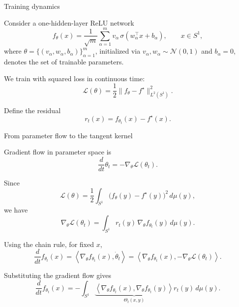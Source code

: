 \documentclass[10pt,aspectratio=169]{beamer}
\begin{document}
\begin{frame}{Training dynamics}

	Consider a one-hidden-layer ReLU network
	\[
		f_\theta(x) = \frac{1}{\sqrt m} \sum_{\alpha=1}^{m} v_\alpha\,\sigma(w_\alpha^\top x+b_\alpha), \qquad x\in S^1,
	\]
	where \(\theta = \{(v_\alpha, w_\alpha, b_\alpha)\}_{\alpha=1}^m\),
	initialized via \(v_\alpha, w_\alpha \sim \mathcal{N}(0, 1)\) and \(b_\alpha = 0\),
	denotes the set of trainable parameters.

	\pause
	We train with squared loss in continuous time:
	\[
		\mathcal L(\theta)
		=
		\frac12
		\|f_\theta-f^\star\|_{L^2(S^1)}^2 .
	\]

	\pause

	Define the residual
	\[
		r_t(x)=f_{\theta_t}(x)-f^\star(x).
	\]

\end{frame}

\begin{frame}{From parameter flow to the tangent kernel}

	Gradient flow in parameter space is
	\[
		\frac{d}{dt}\theta_t
		=
		-\nabla_\theta \mathcal L(\theta_t).
	\]

	\pause
	Since
	\[
		\mathcal L(\theta)
		=
		\frac12
		\int_{S^1}
		\bigl(f_\theta(y)-f^\star(y)\bigr)^2
		\,d\mu(y),
	\]
	\pause
	we have
	\[
		\nabla_\theta \mathcal L(\theta_t)
		=
		\int_{S^1}
		r_t(y)\,\nabla_\theta f_{\theta_t}(y)
		\,d\mu(y).
	\]

	\pause
	Using the chain rule, for fixed \(x\),
	\[
		\frac{d}{dt} f_{\theta_t}(x)
		=
		\left\langle
		\nabla_\theta f_{\theta_t}(x),
		\dot\theta_t
		\right\rangle
		= \left\langle \nabla_\theta f_{\theta_t}(x), -\nabla_\theta \mathcal L(\theta_t) \right\rangle.
	\]

	\pause
	Substituting the gradient flow gives
	\[
		\frac{d}{dt} f_{\theta_t}(x)
		=
		-
		\int_{S^1}
		\underbrace{
			\left\langle
			\nabla_\theta f_{\theta_t}(x),
			\nabla_\theta f_{\theta_t}(y)
			\right\rangle
		}_{\Theta_t(x,y)}
		r_t(y)
		\,d\mu(y).
	\]


\end{frame}
\end{document}
